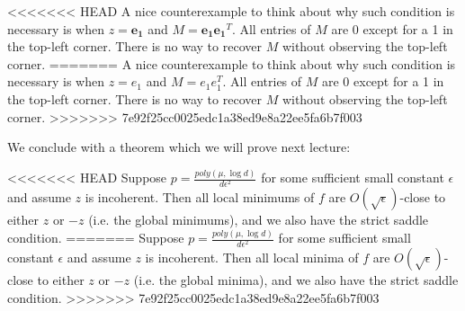 
\begin{remark}
<<<<<<< HEAD
A nice counterexample to think about why such condition is necessary is when $z = \mathbf{e_1}$ and $M = \mathbf{e_1}\mathbf{e_1}^T$.  All entries of $M$ are 0 except for a 1 in the top-left corner. There is no way to recover $M$ without observing the top-left corner.
=======
A nice counterexample to think about why such condition is necessary is when $z = e_1$ and $M = e_1 e_1^T$. All entries of $M$ are 0 except for a 1 in the top-left corner. There is no way to recover $M$ without observing the top-left corner.
>>>>>>> 7e92f25cc0025edc1a38ed9e8a22ee5fa6b7f003
\end{remark}

We conclude with a theorem which we will prove next lecture:
\begin{theorem}
<<<<<<< HEAD
Suppose $p = \frac{poly(\mu, \log d)}{d\epsilon^2}$ for some sufficient small constant $\epsilon$ and assume $z$ is incoherent. Then all local minimums of $f$ are $O(\sqrt{\epsilon})$-close to either $z$ or $-z$ (i.e. the global minimums), and we also have the strict saddle condition.
=======
Suppose $p = \frac{poly(\mu, \log d)}{d\epsilon^2}$ for some sufficient small constant $\epsilon$ and assume $z$ is incoherent. Then all local minima of $f$ are $O(\sqrt{\epsilon})$-close to either $z$ or $-z$ (i.e. the global minima), and we also have the strict saddle condition.
>>>>>>> 7e92f25cc0025edc1a38ed9e8a22ee5fa6b7f003
\end{theorem}
